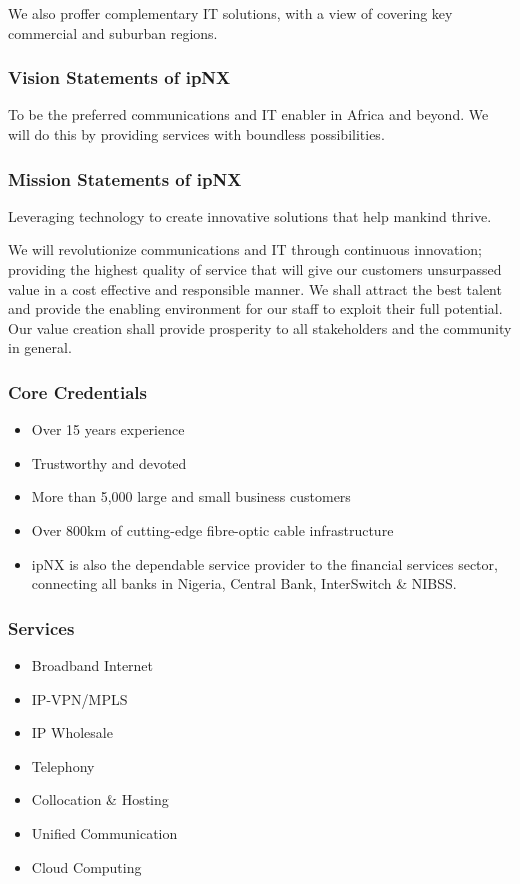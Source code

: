 We also proffer complementary IT solutions, with a view of covering key commercial and suburban regions.
\subsubsection{Vision Statements of ipNX}
To be the preferred communications and IT enabler in Africa and beyond. We will do this by providing services with boundless possibilities.
\subsubsection{Mission Statements of ipNX}
Leveraging technology to create innovative solutions that help mankind thrive.

We will revolutionize communications and IT through continuous innovation; providing the highest quality of service that will give our customers unsurpassed value in a cost effective and responsible manner.
We shall attract the best talent and provide the enabling environment for our staff to exploit their full potential.
Our value creation shall provide prosperity to all stakeholders and the community in general.
\subsubsection{Core Credentials}
\begin{itemize}
	\item[] Over 15 years experience
	\item[] Trustworthy and devoted
	\item[] More than 5,000 large and small business customers
	\item[] Over 800km of cutting-edge fibre-optic cable infrastructure
	\item[] ipNX is also the dependable service provider to the financial services sector, connecting all banks in Nigeria, Central Bank, InterSwitch \& NIBSS.
\end{itemize}
\subsubsection{Services}
\begin{itemize}
	\item[] Broadband Internet
	\item[] IP-VPN/MPLS
	\item[] IP Wholesale
	\item[] Telephony
	\item[] Collocation \& Hosting
	\item[] Unified Communication
	\item[] Cloud Computing
\end{itemize}

